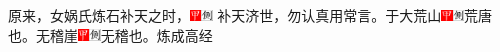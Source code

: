 原来，女娲氏炼石补天之时，{\includegraphics[width=3mm]{../Images/00002}\includegraphics[width=3mm]{../Images/00011} \footnotesize \kaishu 补天济世，勿认真用常言。}于大荒山{\includegraphics[width=3mm]{../Images/00002}\includegraphics[width=3mm]{../Images/00011}\footnotesize 荒唐也。}无稽崖{\includegraphics[width=3mm]{../Images/00002}\includegraphics[width=3mm]{../Images/00011}\footnotesize 无稽也。}炼成高经